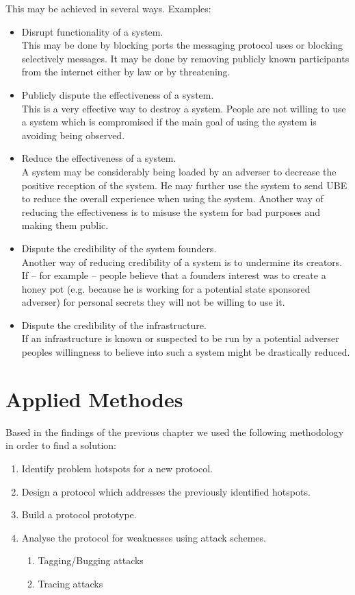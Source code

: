 This may be achieved in several ways. Examples:
\begin{itemize}
	\item Disrupt functionality of a system.\\ 
	This may be done by blocking ports the messaging protocol uses or blocking selectively messages. It may be done by removing publicly known participants from the internet either by law or by threatening.
	\item Publicly dispute the effectiveness of a system.\\
	This is a very effective way to destroy a system. People are not willing to use a system which is compromised if the main goal of using the system is avoiding being observed.
	\item Reduce the effectiveness of a system.\\
	A system may be considerably being loaded by an adverser to decrease the positive reception of the system. He may further use the system to send UBE to reduce the overall experience when using the system. Another way of reducing the effectiveness is to misuse the system for bad purposes and making them public.
	\item Dispute the credibility of the system founders.\\
	Another way of reducing credibility of a system is to undermine its creators. If -- for example -- people believe that a founders interest was to create a honey pot (e.g. because he is working for a potential state sponsored adverser) for personal secrets they will not be willing to use it.
	\item Dispute the credibility of the infrastructure.\\
	If an infrastructure is known or suspected to be run by a potential adverser peoples willingness to believe into such a system might be drastically reduced.
\end{itemize}

\chapter{Applied Methodes\label{sec:appliedMethods}}
Based in the findings of the previous chapter we used the following methodology in order to find a solution:
\begin{enumerate}
	\item Identify problem hotspots for a new protocol.
	\item Design a protocol which addresses the previously identified hotspots.
	\item Build a protocol prototype.
	\item Analyse the protocol for weaknesses using attack schemes.
	\begin{enumerate}
		\item Tagging/Bugging attacks
		\item Tracing attacks
	\end{enumerate}
\end{enumerate}

